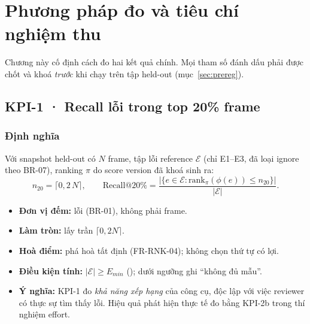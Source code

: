 \chapter{Phương pháp đo và tiêu chí nghiệm thu}
\label{ch:eval}

Chương này cố định cách đo hai kết quả chính. Mọi tham số đánh dấu \TBD{} phải
được chốt và khoá \emph{trước} khi chạy trên tập held-out (mục~\ref{sec:prereg}).

\section{KPI-1 · Recall lỗi trong top 20\% frame}
\label{sec:kpi1}

\subsection{Định nghĩa}
Với snapshot held-out có \(N\) frame, tập lỗi reference \(\mathcal{E}\) (chỉ E1–E3,
đã loại ignore theo BR-07), ranking \(\pi\) do score version đã khoá sinh ra:
\[
  n_{20} = \lceil 0{,}2\,N \rceil, \qquad
  \mathrm{Recall@20\%} = \frac{\bigl|\{e \in \mathcal{E} : \mathrm{rank}_\pi(\phi(e)) \le n_{20}\}\bigr|}{|\mathcal{E}|}.
\]

\begin{itemize}
  \item \textbf{Đơn vị đếm:} lỗi (BR-01), không phải frame.
  \item \textbf{Làm tròn:} lấy trần \(\lceil 0{,}2N \rceil\).
  \item \textbf{Hoà điểm:} phá hoà tất định (FR-RNK-04); không chọn thứ tự có lợi.
  \item \textbf{Điều kiện tính:} \(|\mathcal{E}| \ge E_{min}\) (\TBD[-K4]); dưới
        ngưỡng ghi ``không đủ mẫu''.
  \item \textbf{Ý nghĩa:} KPI-1 đo \emph{khả năng xếp hạng} của công cụ, độc lập
        với việc reviewer có thực sự tìm thấy lỗi. Hiệu quả phát hiện thực tế đo
        bằng KPI-2b trong thí nghiệm effort.
\end{itemize}

